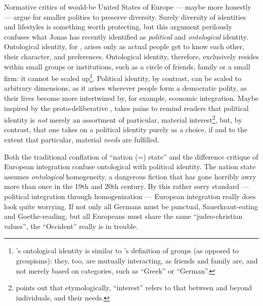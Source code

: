 Normative critics of would-be United States of Europe --- maybe more honestly --- argue for smaller polities to preserve diversity. Surely diversity of identities and lifestyles is something worth protecting, but this argument perilously confuses what Jonas \cite{Marx2012} has recently identified as \emph{political} and \emph{ontological} identity. Ontological identity, for \citeauthor{Marx2012}, arises only as actual people get to know each other, their character, and preferences. Ontological identity, therefore, exclusively resides within small groups or institutions, such as a circle of friends, family or a small firm: it cannot be scaled up\footnote{
	\cite{Marx2012}'s ontological identity is similar to \cite{Brubaker-2002-aa}'s definition of groups (as opposed to groupisms): they, too, are mutually interacting, as friends and family are, and not merely based on categories, such as ``Greek'' or ``German''.}.
Political identity, by contrast, can be scaled to arbitrary dimensions, as it arises wherever people form a democratic polity, as their lives become more intertwined by, for example, economic integration. Maybe inspired by the proto-deliberative \cite{Arendt1958}, \citeauthor{Marx2012} takes pains to remind readers that political identity is \emph{not} merely an assortment of particular, material interest\footnote{
	\citeauthor{Marx2012} points out that etymologically, ``interest'' refers to that between and beyond individuals, and their needs.}, 
but, by contrast, that one takes on a political identity purely as a choice, if and to the extent that particular, material \emph{needs} are fulfilled. 

Both the traditional conflation of ``nation (=) state'' and the difference critique of European integration confuse ontological with political identity. The nation state assumes \emph{ontological} homogeneity, a dangerous fiction that has gone horribly awry more than once in the 19th and 20th century. By this rather sorry standard --- political integration through homogenization --- European integration really does look quite worrying. If not only all Germans must be punctual, Sauerkraut-eating and Goethe-reading, but all Europeans must share the same ``judeo-christian values'', the ``Occident'' really is in trouble.

